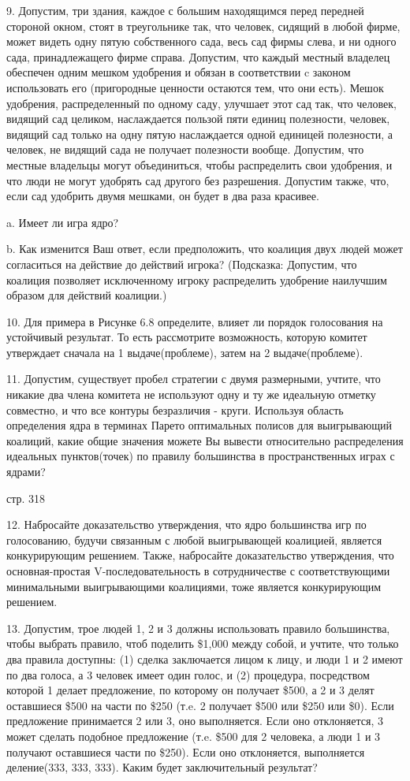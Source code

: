 \documentclass[a4paper,12pt]{article}
\begin{document}
9. Допустим, три здания, каждое с большим
находящимся перед передней стороной окном, стоят в
треугольнике так, что человек, сидящий в любой
фирме, может видеть одну пятую собственного сада,
весь сад фирмы слева, и ни одного сада,
принадлежащего фирме справа. Допустим, что каждый
местный владелец обеспечен одним мешком удобрения и
обязан в соответствии c законом использовать его
(пригородные ценности остаются тем, что они есть).
Мешок удобрения, распределенный по одному саду,
улучшает этот сад так, что человек, видящий сад
целиком, наслаждается пользой пяти единиц
полезности, человек, видящий сад только на одну
пятую наслаждается одной единицей полезности, а
человек, не видящий сада не получает полезности
вообще. Допустим, что местные владельцы могут
объединиться, чтобы распределить свои удобрения, и
что люди не могут удобрять сад другого без
разрешения. Допустим также, что, если сад удобрить
двумя мешками, он будет в два раза красивее.

a. Имеет ли игра ядро?

b. Как изменится Ваш ответ, если предположить, что
коалиция двух людей может согласиться на действие
до действий игрока? (Подсказка: Допустим, что
коалиция позволяет исключенному игроку распределить
удобрение наилучшим образом для действий коалиции.)

10. Для примера в Рисунке 6.8 определите, влияет ли
порядок голосования на устойчивый результат. То
есть рассмотрите возможность, которую комитет
утверждает сначала на 1 выдаче(проблеме), затем на
2 выдаче(проблеме).

11. Допустим, существует пробел стратегии с двумя
размерными, учтите, что никакие два члена комитета
не используют одну и ту же идеальную отметку
совместно, и что все контуры безразличия - круги.
Используя область определения ядра в терминах
Парето оптимальных полисов для выигрывающий
коалиций, какие общие значения можете Вы вывести
относительно распределения идеальных пунктов(точек)
по правилу большинства в пространственных играх с
ядрами?

стр. 318

12. Набросайте доказательство утверждения, что ядро
большинства игр по голосованию, будучи связанным с
любой выигрывающей коалицией, является
конкурирующим решением. Также, набросайте
доказательство утверждения, что основная-простая
V-последовательность в сотрудничестве с
соответствующими минимальными выигрывающими
коалициями, тоже является конкурирующим решением.

13. Допустим, трое людей 1, 2 и 3 должны
использовать правило большинства, чтобы выбрать
правило, чтоб поделить \$1,000 между собой, и
учтите, что только два правила доступны: (1) сделка
заключается лицом к лицу, и люди 1 и 2 имеют по два
голоса, а 3 человек имеет один голос, и (2)
процедура, посредством которой 1 делает
предложение, по которому он получает \$500, а 2 и 3
делят оставшиеся \$500 на части по \$250 (т.e. 2
получает \$500 или \$250 или \$0). Если предложение
принимается 2 или 3, оно выполняется. Если оно
отклоняется, 3 может сделать подобное предложение
(т.e. \$500 для 2 человека, а люди 1 и 3 получают
оставшиеся части по \$250). Если оно отклоняется,
выполняется деление(333, 333, 333). Каким будет
заключительный результат?
\end{document}
